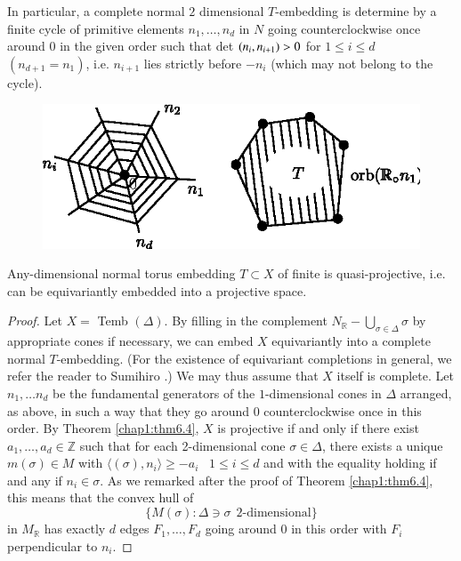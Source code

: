   
  In particular, a complete normal $2$ dimensional $T$-embedding is
  determine by a finite cycle of primitive elements  $n_1, \ldots, n_d$
  in $N$ going counterclockwise once around $0$ in the given order
  such that det $(n_i,\break n_{i+1})> 0$ for $1 \leq i \leq d$
  $(n_{d+1}=n_1)$, i.e. $n_{i+1}$ lies strictly before  $-n_i$ (which
  may not belong to the cycle). 
\begin{figure}[H]
\centering 
\includegraphics{vol58-fig/fig58-12.eps} 
\end{figure}

  
  \begin{prop}\label{chap1:prop8.1} %
Any-dimensional normal torus embedding $T \subset X$
of finite is quasi-projective, i.e. can be equivariantly embedded into
a projective space.  
  \end{prop} 

  \begin{proof}
Let $X=$ Temb $(\Delta)$. By filling in the complement
$N_{\mathbb{R}}- \bigcup\limits_{\sigma \in \Delta} \sigma$ by
appropriate cones if necessary, we can embed $X$ equivariantly into a
complete normal $T$-embedding. (For the existence of equivariant
completions in general, we refer the reader to Sumihiro \cite{keyS3}.) We
may thus assume that $X$ itself is complete. Let $n_1, \ldots n_d$ be
the fundamental generators of the $1$-dimensional cones in $\Delta$
arranged, as above, in such a way that they go around $0$
counterclockwise once in this order. By Theorem \ref{chap1:thm6.4},
$X$ is projective 
if and only if there exist $a_1, \ldots , a_d \in \mathbb{Z}$ such
that for each 2-dimensional cone $\sigma \in \Delta $, there exists
a unique $m(\sigma) \in M$ with $\langle (\sigma), n_i \rangle \geq
-a_i$ ~$1 \leq i \leq d$ and with the equality holding if and any if
$n_i \in \sigma$. As we remarked after the proof of Theorem \ref{chap1:thm6.4},
this means that the convex hull of    
$$
\{ M(\sigma): \Delta \ni \sigma  ~~\text{2-dimensional}\} 
$$
in $M_\mathbb{R}$ has exactly $d$ edges $F_1, \ldots , F_d$ going
around 0 in this order with $F_i$ perpendicular to $n_i$. 
   \end{proof}   
   
